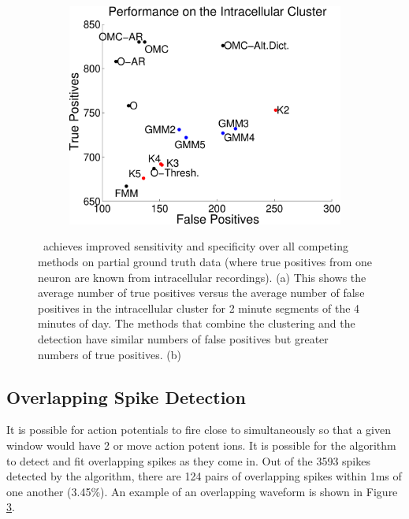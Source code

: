 % 
\begin{center}
\begin{figure}
\begin{subfigure}[b]{.49\textwidth}
\centering
\includegraphics[width=\textwidth]{../figs/truefalsepositive.pdf}
\caption{}
\label{hc1res}
\end{subfigure}
\begin{subfigure}[b]{.49\textwidth}
\caption{}
\label{overlapping}
\end{subfigure}
\caption{\smug~achieves improved sensitivity and specificity over all competing methods on partial ground truth data (where true positives from one neuron are known from intracellular recordings).  (a) This shows the average number of true positives versus the average number of false positives in the intracellular cluster for 2 minute segments of the 4 minutes of day.  The methods that combine the clustering and the detection have similar numbers of false positives but greater numbers of true positives.    (b) 
}
\end{figure}
\end{center}


\subsection{Overlapping Spike Detection}
It is possible for action potentials to fire close to simultaneously so that a given window would have 2 or move action potent ions.  It is possible for the algorithm to detect and fit overlapping spikes as they come in.  Out of the 3593 spikes detected by the algorithm, there are 124 pairs of overlapping spikes within 1ms of one another (3.45\%).  An example of an overlapping waveform is shown in Figure \ref{overlapping}.

